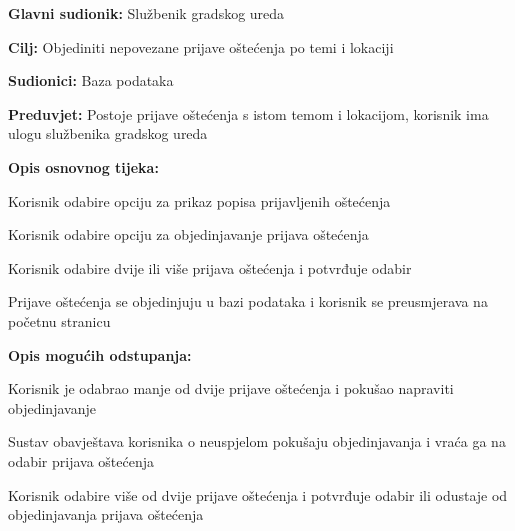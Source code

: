 \noindent {}
\begin{packed_item}

	\item \textbf{Glavni sudionik: } Službenik gradskog ureda
	\item  \textbf{Cilj:} Objediniti nepovezane prijave oštećenja po temi i lokaciji
	\item  \textbf{Sudionici:} Baza podataka
	\item  \textbf{Preduvjet:} Postoje prijave oštećenja s istom temom i lokacijom, korisnik ima ulogu službenika gradskog ureda
	\item  \textbf{Opis osnovnog tijeka:}

	\item[] \begin{packed_enum}

		\item Korisnik odabire opciju za prikaz popisa prijavljenih oštećenja
		\item Korisnik odabire opciju za objedinjavanje prijava oštećenja
		\item Korisnik odabire dvije ili više prijava oštećenja i potvrđuje odabir
		\item Prijave oštećenja se objedinjuju u bazi podataka i korisnik se preusmjerava na početnu stranicu
	\end{packed_enum}

	\item  \textbf{Opis mogućih odstupanja:}

	\item[] \begin{packed_item}

		\item[3.a] Korisnik je odabrao manje od dvije prijave oštećenja i pokušao napraviti objedinjavanje
		\item[] \begin{packed_enum}

			\item Sustav obavještava korisnika o neuspjelom pokušaju objedinjavanja i vraća ga na odabir prijava oštećenja
			\item Korisnik odabire više od dvije prijave oštećenja i potvrđuje odabir ili odustaje od objedinjavanja prijava oštećenja
		\end{packed_enum}

	\end{packed_item}
\end{packed_item}


